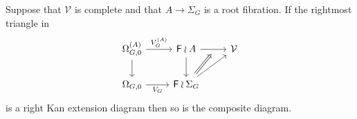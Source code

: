 \documentclass[a4paper,10pt]{article}%
\begin{document}
\begin{lemma}\label{LANPULLCOMA LEM}
	Suppose that $\mathcal{V}$ is complete and that $A \to \Sigma_G$ is a root fibration. If the rightmost triangle in 
	\begin{equation}
	\begin{tikzcd}
		\Omega_{G,0}^{(A)} \ar{r}{V_G^{(A)}} 
		\ar{d} & 
		\Fin \wr A  
		\ar{d}  \ar{r}[swap,name=F]{}&
		\mathcal{V}		
	\\
		\Omega_{G,0} \ar{r}[swap]{V_G} & 
		|[alias=FEG]|\Fin \wr \Sigma_G \ar{ru}
	\arrow[Rightarrow, from=FEG, to=F,shorten <=0.15cm]
	\end{tikzcd}
	\end{equation}
is a right Kan extension diagram then so is the composite diagram.
\end{lemma}
\end{document}
